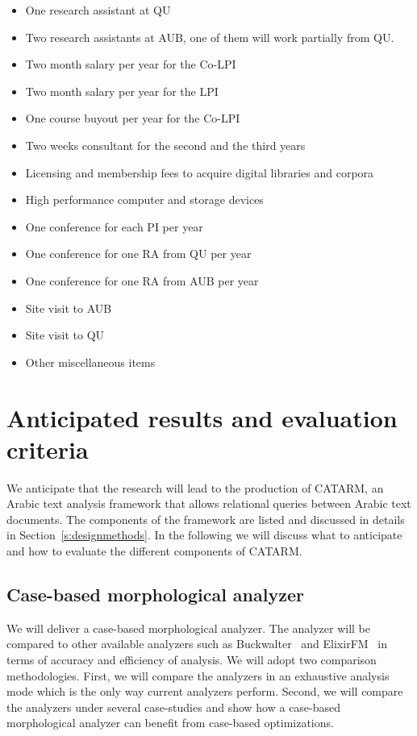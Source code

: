 \documentclass[12pt]{article}
\begin{document}
\begin{itemize}
\item One research assistant at QU
\item Two research assistants at AUB, one of them will 
work partially from QU. 
\item Two month salary per year for the Co-LPI
\item Two month salary per year for the LPI
\item One course buyout per year for the Co-LPI
\item Two weeks consultant for the second and the third years
\item Licensing and membership fees to acquire digital libraries and corpora
\item High performance computer and storage devices
\item One conference for each PI per year
\item One conference for one RA from QU per year
\item One conference for one RA from AUB per year
\item Site visit to AUB 
\item Site visit to QU 
\item Other miscellaneous items
\end{itemize}


\section{Anticipated results and evaluation criteria}
\label{s:results}

We anticipate that the research will lead to the production of 
CATARM, an Arabic text analysis framework that allows relational 
queries between Arabic text documents.
The components of the framework are listed and discussed
in details in Section~\ref{s:designmethods}.
In the following we will discuss what to anticipate and 
how to evaluate the different components of CATARM. 

\subsection{Case-based morphological analyzer} 

We will deliver a case-based morphological analyzer. 
The analyzer will be compared to other available analyzers such as
Buckwalter~\cite{Tim04} and ElixirFM~\cite{Otakar:07} in terms
of accuracy and efficiency of analysis.
We will adopt two comparison methodologies. 
First, we will compare the analyzers in an exhaustive analysis mode
which is the only way current analyzers perform. 
Second, we will compare the analyzers under several case-studies
and show how a case-based morphological analyzer can benefit
from case-based optimizations.
\end{document}
